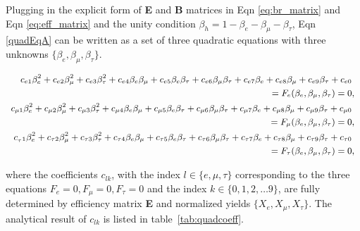 \noindent Plugging in the explicit form of \textbf{E} and \textbf{B} matrices in Eqn \ref{eq:br_matrix} 
and Eqn \ref{eq:eff_matrix} and the unity condition $\beta_h = 1- \beta_e -
\beta_\mu - \beta_\tau$, Eqn \ref{quadEqA} can be written as a set of
three quadratic equations with three unknowns $\{\beta_{e},\beta_{\mu},\beta_{\tau}\}$.
% 
\begin{singlespace}
\begin{equation} \label{quadEqB}
    \small
	\begin{split}
        c_{e1} \beta_e^2 + c_{e2} \beta_\mu^2 + c_{e3} \beta_\tau^2 + 
        c_{e4} \beta_e\beta_\mu + c_{e5} \beta_e\beta_\tau + c_{e6} \beta_\mu\beta_\tau +
        c_{e7} \beta_e + c_{e8} \beta_\mu + c_{e9} \beta_\tau + c_{e0} &\\
        = F_e(\beta_e,\beta_\mu,\beta_\tau) = 0 &,\\
        c_{\mu 1} \beta_e^2 + c_{\mu 2} \beta_\mu^2 + c_{\mu 3} \beta_\tau^2 + 
        c_{\mu 4} \beta_e\beta_\mu + c_{\mu 5} \beta_e\beta_\tau + c_{\mu 6} \beta_\mu\beta_\tau +
        c_{\mu 7} \beta_e + c_{\mu 8} \beta_\mu + c_{\mu 9} \beta_\tau + c_{\mu 0} &\\
        = F_\mu(\beta_e,\beta_\mu,\beta_\tau) = 0 &, \\
        c_{_\tau1} \beta_e^2 + c_{\tau2} \beta_\mu^2 + c_{\tau3} \beta_\tau^2 + 
        c_{\tau4} \beta_e\beta_\mu + c_{\tau5} \beta_e\beta_\tau + c_{\tau6} \beta_\mu\beta_\tau +
        c_{\tau7} \beta_e + c_{\tau8} \beta_\mu + c_{\tau9} \beta_\tau + c_{\tau0} &\\
        = F_\tau(\beta_e,\beta_\mu,\beta_\tau) = 0 &,
    \end{split}
\end{equation}
\end{singlespace}


\noindent where the coefficients $c_{lk}$, with the index $l\in \{ e,\mu,\tau \}$ corresponding
to the three equations $F_e=0,F_\mu=0,F_\tau=0$ and the index $k\in\{ 0,1,2,\dots 9\}$,
are fully determined by efficiency matrix \textbf{E} and normalized yields $\{X_e,X_\mu,X_\tau\}$.
The analytical result of $c_{lk}$ is listed in table~\ref{tab:quadcoeff}.



